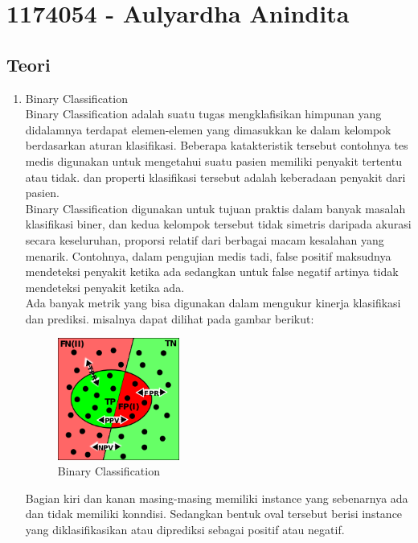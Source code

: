\section{1174054 - Aulyardha Anindita}

\subsection{Teori}
\begin{enumerate}
\item Binary Classification \\
Binary Classification adalah suatu tugas mengklafisikan himpunan yang didalamnya terdapat elemen-elemen yang dimasukkan ke dalam kelompok berdasarkan aturan klasifikasi. Beberapa katakteristik tersebut contohnya tes medis digunakan untuk mengetahui suatu pasien memiliki penyakit tertentu atau tidak. dan properti klasifikasi tersebut adalah keberadaan penyakit dari pasien.\\

Binary Classification digunakan untuk tujuan praktis dalam banyak masalah klasifikasi biner, dan kedua kelompok tersebut tidak simetris daripada akurasi secara keseluruhan, proporsi relatif dari berbagai macam kesalahan yang menarik. Contohnya, dalam pengujian medis tadi, false positif maksudnya mendeteksi penyakit ketika ada sedangkan untuk false negatif artinya tidak mendeteksi penyakit ketika ada.\\

Ada banyak metrik yang bisa digunakan dalam mengukur kinerja klasifikasi dan prediksi. misalnya dapat dilihat pada gambar berikut:
\begin{figure}[H]
		\includegraphics[width=4cm]{figures/1174054/2/binary.png}
		\centering
		\caption{Binary Classification}
\end{figure}

Bagian kiri dan kanan masing-masing memiliki instance yang sebenarnya ada dan tidak memiliki konndisi. Sedangkan bentuk oval tersebut berisi instance yang diklasifikasikan atau diprediksi sebagai positif atau negatif.


\end{enumerate}
